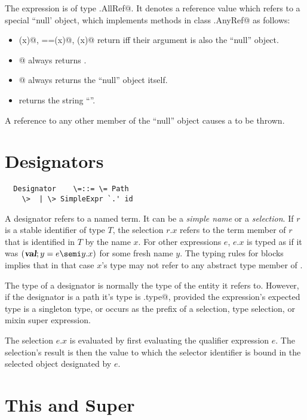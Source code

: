 \documentclass[11pt]{report}
\begin{document}
The \verb@null@ expression is of type \verb@scala.AllRef@. It
denotes a reference value which refers to a special ``null' object,
which implements methods in class \verb@scala.AnyRef@ as follows:
\begin{itemize}
\item[]
\verb@eq(x)@, \verb@==(x)@, \verb@equals(x)@ return \verb@true@ iff their
argument \verb@x@ is also the ``null'' object.
\item[]
\verb@isInstance[T]@ always returns \verb@false@.
\item[]
\verb@asInstance[T]@ always returns the ``null'' object itself.
\item[]
\verb@toString@ returns the string ``\verb@null@''.
\end{itemize}
A reference to any other member of the ``null'' object causes a
\verb@NullPointerException@ to be thrown. 

\section{Designators}
\label{sec:designators}

\syntax\begin{verbatim}
  Designator    \=::= \= Path
	\>  | \> SimpleExpr `.' id
\end{verbatim}

A designator refers to a named term. It can be a {\em simple name} or
a {\em selection}. If $r$ is a stable identifier of type $T$, the
selection $r.x$ refers to the term member of $r$ that is identified in
$T$ by the name $x$.  For other expressions $e$, $e.x$ is typed as if
it was $(\VAL;y=e\semi y.x)$ for some fresh name $y$. The typing rules
for blocks implies that in that case $x$'s type may not refer to any
abstract type member of \verb@e@.

The type of a designator is normally the type of the entity it refers
to. However, if the designator is a path  \verb@p@
it's type is \verb@p.type@, provided the expression's expected type is
a singleton type, or \verb@p@ occurs as the prefix of a selection,
type selection, or mixin super expression.

The selection $e.x$ is evaluated by first evaluating the qualifier
expression $e$. The selection's result is then the value to which the
selector identifier is bound in the selected object designated by $e$.

\section{This and Super}
\label{sec:this-super}
\end{document}

